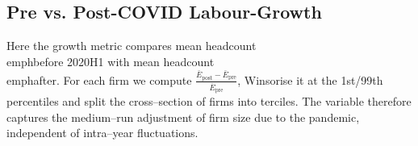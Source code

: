 \documentclass{article}
\newcommand{\cleanedresultsdir}{../../results/cleaned}
\begin{document}
\subsection{Pre vs. Post-COVID Labour-Growth}
Here the growth metric compares mean headcount \\emph{before} 2020H1 with mean
headcount \\emph{after}.  For each firm we compute
$\tfrac{\bar E_{\text{post}}-\bar E_{\text{pre}}}{\bar E_{\text{pre}}}$, Winsorise
it at the 1st/99th percentiles and split the cross--section of firms into
terciles.  The variable therefore captures the medium--run adjustment of firm
size due to the pandemic, independent of intra--year fluctuations.


\clearpage
\end{document}
